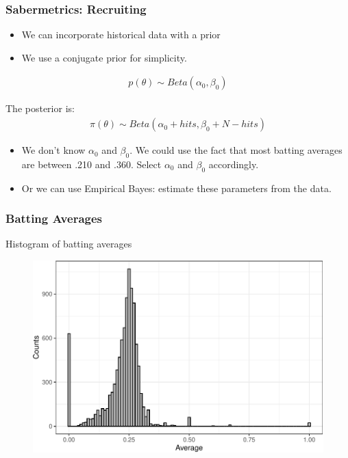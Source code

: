 \documentclass[
  shownotes,
  xcolor={svgnames},
  hyperref={colorlinks,citecolor=DarkBlue,linkcolor=DarkRed,urlcolor=DarkBlue}
  , aspectratio=169]{beamer}
\begin{document}
\begin{frame}[fragile]
\frametitle{Sabermetrics: Recruiting}

\begin{itemize}

\item We can incorporate historical data with a prior 
\medskip
\item We use a conjugate prior for simplicity. 
\end{itemize}



\begin{align}
p(\theta) \sim Beta(\alpha_0,\beta_0)
\end{align}

The posterior is:
\begin{align}
\pi(\theta)\sim Beta(\alpha_0+hits,\beta_0+N-hits)
\end{align}

\medskip
\begin{itemize}
  \item We don't know $\alpha_0$ and $\beta_0$. We could use the fact that most batting averages are between .210 and .360. Select $\alpha_0$ and $\beta_0$ accordingly.
  \medskip
  \item Or we can use Empirical Bayes: estimate these parameters from the data.
\end{itemize}


\end{frame}
\begin{frame}[fragile]
\frametitle{Batting Averages}
Histogram of batting averages

\bigskip
\bigskip
\begin{figure}[H] \centering
  \centering
  \includegraphics[scale=0.6]{figures/average_hist.pdf}
  \\
  \tiny 
\end{figure}



\end{frame}
\end{document}

